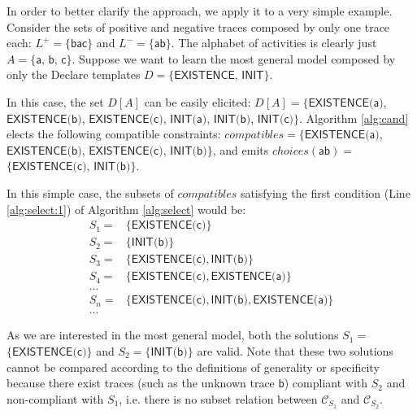 In order to better clarify the approach, we apply it to a very simple example.  
Consider the sets of positive and negative traces composed by only one trace each: $L^+=\{\textsf{bac}\}$ and $L^-=\{\textsf{ab}\}$. The alphabet of activities is clearly just $A=\{\textsf{a, b, c}\}$. Suppose we want to learn the most general model composed by only the Declare templates $D=\{\textsf{EXISTENCE, INIT}\}$.

In this case, the set $D[A]$ can be easily elicited: $D[A]=\{ \textsf{EXISTENCE(a)}$, $\textsf{EXISTENCE(b)}$, $\textsf{EXISTENCE(c)}$, $\textsf{INIT(a)}$, $\textsf{INIT(b)}$, $\textsf{INIT(c)} \}$. Algorithm \ref{alg:cand} elects the following compatible constraints: ${compatibles}=$$\{ \textsf{EXISTENCE(a)}$, $\textsf{EXISTENCE(b)}$, $\textsf{EXISTENCE(c)}$, $\textsf{INIT(b)}\}$, and emits ${choices}(\textsf{ab})=$$\{ \textsf{EXISTENCE(c)}$, $\textsf{INIT(b)}\}$.


In this simple case, the subsets of ${compatibles}$ satisfying the first condition (Line \ref{alg:select:1}) of Algorithm \ref{alg:select} would be: 
\[
\begin{array}{cl}
 S_1= &  \{\textsf{EXISTENCE(c)}\}  \\
 S_2= &  \{\textsf{INIT(b)}\}   \\
 S_3= &  \{\textsf{EXISTENCE(c)}, \textsf{INIT(b)}\} \\
 S_4= & \{\textsf{EXISTENCE(c)}, \textsf{EXISTENCE(a)}\} \\
  ... & \\
 S_n= & \{\textsf{EXISTENCE(c)}, \textsf{INIT(b)}, \textsf{EXISTENCE(a)}\} \\
 ... &
\end{array}
\]

As we are interested in the most general model, both the solutions $S_1=$ $\{\textsf{EXISTENCE(c)}\}$ and $S_2=$$\{\textsf{INIT(b)}\}$ are valid. Note that these two solutions cannot be compared according to the definitions of generality or specificity because there exist traces (such as the unknown trace $\textsf{b}$) compliant with $S_2$ and non-compliant with $S_1$, i.e. there is no subset relation between $\mathcal{C}_{S_1}$ and $\mathcal{C}_{S_2}$.

